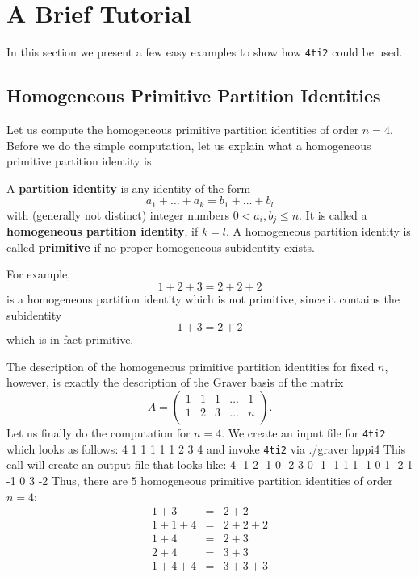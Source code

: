 \documentclass[12pt]{article}
\newenvironment{myverbatim}%
  {\quote\verbatim}%
  {\endverbatim\endquote}
\newcommand\File{\begingroup \urlstyle{sf}\Url}
\theoremstyle{definition}
\newcommand{\important}{\textbf}
\newcommand{\FourTiTwo}{{\tt 4ti2}}
\begin{document}
\section{A Brief Tutorial}
In this section we present a few easy examples to show how 
\FourTiTwo{} could be used.

\subsection{Homogeneous Primitive Partition Identities}
Let us compute the homogeneous primitive partition identities of order
$n=4$. Before we do the simple computation, let us explain what a
homogeneous primitive partition identity is.

A \important{partition identity} is any identity of the form
\[
a_1+\ldots+a_k=b_1+\ldots+b_l
\]
with (generally not distinct) integer numbers $0<a_i,b_j\leq n$. It is
called a \important{homogeneous partition identity}, if $k=l$. A homogeneous
partition identity is called \important{primitive} if no proper homogeneous
subidentity exists.

For example, 
\[
1+2+3=2+2+2
\]
is a homogeneous partition identity which is not primitive, since it
contains the subidentity
\[
1+3=2+2
\]
which is in fact primitive.

The description of the homogeneous primitive partition identities for
fixed $n$, however, is exactly the description of the Graver basis of
the matrix 
\[
A=
\left(
\begin{array}{ccccc}
 1 & 1 & 1 & \ldots & 1 \\ 
 1 & 2 & 3 & \ldots & n \\ 
\end{array}
\right).
\]
Let us finally do the computation for $n=4$. We create an input file
\File{hppi4} for \FourTiTwo{} which looks as follows: 
\begin{myverbatim}
2 4
1 1 1 1
1 2 3 4
\end{myverbatim}
and invoke \FourTiTwo{} via
\begin{myverbatim}
./graver hppi4
\end{myverbatim}
This call will create an output file \File{hppi4.gra} that looks
like:
\begin{myverbatim}
5 4
-1 2 -1  0
-2 3  0 -1
-1 1  1 -1
 0 1 -2  1
-1 0  3 -2
\end{myverbatim}
Thus, there are $5$ homogeneous primitive partition identities of
order $n=4$:
\begin{eqnarray*}
1+3   & = & 2+2\\
1+1+4 & = & 2+2+2\\
1+4   & = & 2+3\\
2+4   & = & 3+3\\
1+4+4 & = & 3+3+3
\end{eqnarray*}
\end{document}
